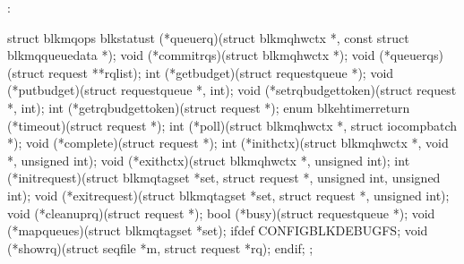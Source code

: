 \documentclass[a4paper,11pt,english]{sphinxmanual}
\begin{document}
:

\begin{sphinxVerbatim}[commandchars=\\\{\}]
struct blk\PYGZus{}mq\PYGZus{}ops \PYGZob{}
    blk\PYGZus{}status\PYGZus{}t (*queue\PYGZus{}rq)(struct blk\PYGZus{}mq\PYGZus{}hw\PYGZus{}ctx *, const struct blk\PYGZus{}mq\PYGZus{}queue\PYGZus{}data *);
    void (*commit\PYGZus{}rqs)(struct blk\PYGZus{}mq\PYGZus{}hw\PYGZus{}ctx *);
    void (*queue\PYGZus{}rqs)(struct request **rqlist);
    int (*get\PYGZus{}budget)(struct request\PYGZus{}queue *);
    void (*put\PYGZus{}budget)(struct request\PYGZus{}queue *, int);
    void (*set\PYGZus{}rq\PYGZus{}budget\PYGZus{}token)(struct request *, int);
    int (*get\PYGZus{}rq\PYGZus{}budget\PYGZus{}token)(struct request *);
    enum blk\PYGZus{}eh\PYGZus{}timer\PYGZus{}return (*timeout)(struct request *);
    int (*poll)(struct blk\PYGZus{}mq\PYGZus{}hw\PYGZus{}ctx *, struct io\PYGZus{}comp\PYGZus{}batch *);
    void (*complete)(struct request *);
    int (*init\PYGZus{}hctx)(struct blk\PYGZus{}mq\PYGZus{}hw\PYGZus{}ctx *, void *, unsigned int);
    void (*exit\PYGZus{}hctx)(struct blk\PYGZus{}mq\PYGZus{}hw\PYGZus{}ctx *, unsigned int);
    int (*init\PYGZus{}request)(struct blk\PYGZus{}mq\PYGZus{}tag\PYGZus{}set *set, struct request *, unsigned int, unsigned int);
    void (*exit\PYGZus{}request)(struct blk\PYGZus{}mq\PYGZus{}tag\PYGZus{}set *set, struct request *, unsigned int);
    void (*cleanup\PYGZus{}rq)(struct request *);
    bool (*busy)(struct request\PYGZus{}queue *);
    void (*map\PYGZus{}queues)(struct blk\PYGZus{}mq\PYGZus{}tag\PYGZus{}set *set);
\PYGZsh{}ifdef CONFIG\PYGZus{}BLK\PYGZus{}DEBUG\PYGZus{}FS;
    void (*show\PYGZus{}rq)(struct seq\PYGZus{}file *m, struct request *rq);
\PYGZsh{}endif;
\PYGZcb{};
\end{sphinxVerbatim}
\end{document}
